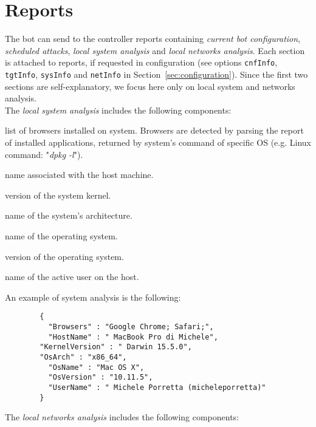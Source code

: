 \section{Reports}
\label{sec:reports}

The bot can send to the controller reports containing \textit{current bot configuration}, \textit{scheduled attacks}, \textit{local system analysis} and \textit{local networks analysis}. Each section is attached to reports, if requested in configuration (see options \texttt{cnfInfo}, \texttt{tgtInfo}, \texttt{sysInfo} and \texttt{netInfo} in Section~\ref{sec:configuration}). Since the first two sections are self-explanatory, we focus here only on local system and networks analysis.\\

The \textit{local system analysis} includes the following components:
\begin{description}
  \setlength\itemsep{1em}
    \item [browsers] list of browsers installed on system. Browsers are detected by parsing the report of installed applications, returned by system's command of specific OS (e.g. Linux command: "\textit{dpkg -l}").
	\item [hostName] name associated with the host machine.
	\item [kernelVersion] version of the system kernel.
	\item [osArch] name of the system's architecture.
  	\item [osName] name of the operating system.
  	\item [osVersion] version of the operating system.
  	\item [userName] name of the active user on the host.
\end{description}
\;

An example of system analysis is the following:
\begin{description}
	\item 
		\begin{verbatim}
		{
		  "Browsers" : "Google Chrome; Safari;",
		  "HostName" : " MacBook Pro di Michele",
	 	"KernelVersion" : " Darwin 15.5.0",
	 	"OsArch" : "x86_64",
		  "OsName" : "Mac OS X",
		  "OsVersion" : "10.11.5",
		  "UserName" : " Michele Porretta (micheleporretta)"
		}
		\end{verbatim}
\end{description}

The \textit{local networks analysis} includes the following components:

